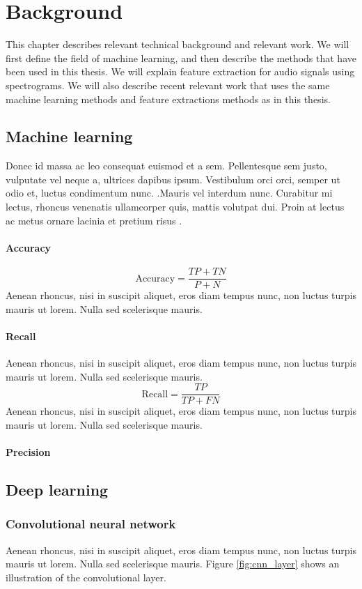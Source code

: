 \chapter{Background}
This chapter describes relevant technical background and relevant work. We will first define the field of machine learning, and then describe the methods that have been used in this thesis. We will explain feature extraction for audio signals using spectrograms. We will also describe recent relevant work that uses the same machine learning methods and feature extractions methods as in this thesis.
\section{Machine learning}
Donec id massa ac leo consequat euismod et a sem. Pellentesque sem justo, vulputate vel neque a, ultrices dapibus ipsum. Vestibulum orci orci, semper ut odio et, luctus condimentum nunc.
\cite{Esteva2017}.Mauris vel interdum nunc. Curabitur mi lectus, rhoncus venenatis ullamcorper quis, mattis volutpat dui. Proin at lectus ac metus ornare lacinia et pretium risus \cite{Homesite2017}.
\subsubsection{Accuracy}

$$ \text{Accuracy} = \frac{TP + TN}{P+N}$$
Aenean rhoncus, nisi in suscipit aliquet, eros diam tempus nunc, non luctus turpis mauris ut lorem. Nulla sed scelerisque mauris.
\subsubsection{Recall}
Aenean rhoncus, nisi in suscipit aliquet, eros diam tempus nunc, non luctus turpis mauris ut lorem. Nulla sed scelerisque mauris.
$$ \text{Recall}= \frac{TP}{TP + FN}$$
Aenean rhoncus, nisi in suscipit aliquet, eros diam tempus nunc, non luctus turpis mauris ut lorem. Nulla sed scelerisque mauris.
\subsubsection{Precision}

\section{Deep learning}
\subsection{Convolutional neural network}
Aenean rhoncus, nisi in suscipit aliquet, eros diam tempus nunc, non luctus turpis mauris ut lorem. Nulla sed scelerisque mauris. Figure \ref{fig:cnn_layer} shows an illustration of the convolutional layer.

